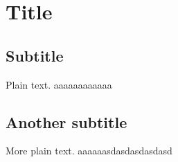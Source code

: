 \documentclass{article}
\begin{document}
\section{Title}

\subsection{Subtitle}

Plain text.
aaaaaaaaaaaa
\subsection{Another subtitle}

More plain text.
aaaaaasdasdasdasdasd
\end{document}
